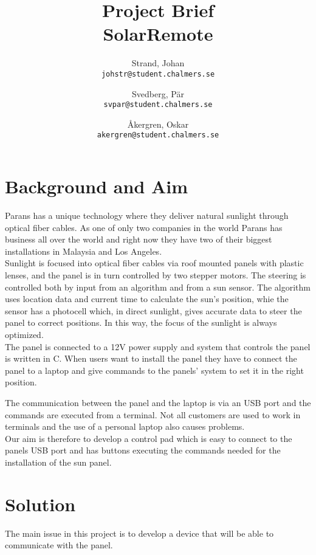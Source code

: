 \documentclass[a4paper]{article}
\author{    Strand, Johan \\ \texttt{johstr@student.chalmers.se} \and
            Svedberg, Pär\\ \texttt{svpar@student.chalmers.se} \and
            Åkergren, Oskar\\ \texttt{akergren@student.chalmers.se}
}
\title{\vspace{-3cm} Project Brief  \\ SolarRemote}
\begin{document}
	\maketitle

	\section*{Background and Aim} %
	\label{sec:background_and_aim}
    	Parans has a unique technology where they deliver natural sunlight through optical fiber cables. As one of only two companies in the world Parans has business all over the world and right now they have two of their biggest installations in Malaysia and Los Angeles. \\

    	\noindent Sunlight is focused into optical fiber cables via roof mounted panels with plastic lenses, and the panel is in turn controlled by two stepper motors. The steering is controlled both by input from an algorithm and from a sun sensor. The algorithm uses location data and current time to calculate the sun's position, whie the sensor has a photocell which, in direct sunlight, gives accurate data to steer the panel to correct positions. In this way, the focus of the sunlight is always optimized. \\

        \noindent The panel is connected to a 12V power supply and system that controls the panel is written in C. When users want to install the panel they have to connect the panel to a laptop and give commands to the panels' system to set it in the right position.
        
        The communication between the panel and the laptop is via an USB port and the commands are executed from a terminal. Not all customers are used to work in terminals and the use of a personal laptop also causes problems. \\

        \noindent Our aim is therefore to develop a control pad which is easy to connect to the panels USB port and has buttons executing the commands needed for the installation of the sun panel.
        

    \section*{Solution} %
    \label{sec:solution}
        The main issue in this project is to develop a device that will be able to communicate with the panel. \\
\end{document}
